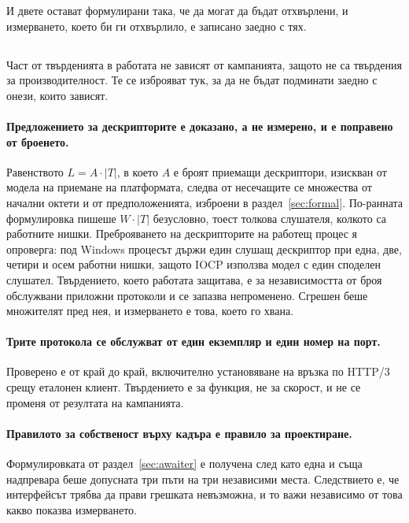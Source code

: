 И двете остават формулирани така, че да могат да бъдат отхвърлени, и измерването, което би ги
отхвърлило, е записано заедно с тях.

\subsection*{}

Част от твърденията в работата не зависят от кампанията, защото не са твърдения за
производителност. Те се изброяват тук, за да не бъдат подминати заедно с онези, които зависят.

\paragraph{Предложението за дескрипторите е доказано, а не измерено, и е поправено от
броенето.} Равенството \(L = A \cdot |T|\), в което \(A\) е броят приемащи дескриптори,
изискван от модела на приемане на платформата, следва от несечащите се множества от начални
октети и от предположенията, изброени в раздел~\ref{sec:formal}. По-ранната формулировка
пишеше \(W \cdot |T|\) безусловно, тоест толкова слушателя, колкото са работните нишки.
Преброяването на дескрипторите на работещ процес я опроверга: под Windows процесът държи
един слушащ дескриптор при една, две, четири и осем работни нишки, защото IOCP използва
модел с един споделен слушател. Твърдението, което работата защитава, е за независимостта от
броя обслужвани приложни протоколи и се запазва непроменено. Сгрешен беше множителят пред
нея, и измерването е това, което го хвана.

\paragraph{Трите протокола се обслужват от един екземпляр и един номер на порт.} Проверено е
от край до край, включително установяване на връзка по HTTP/3 срещу еталонен клиент.
Твърдението е за функция, не за скорост, и не се променя от резултата на кампанията.

\paragraph{Правилото за собственост върху кадъра е правило за проектиране.} Формулировката от
раздел~\ref{sec:awaiter} е получена след като една и съща надпревара беше допусната три пъти
на три независими места. Следствието е, че интерфейсът трябва да прави грешката невъзможна,
и то важи независимо от това какво показва измерването.

